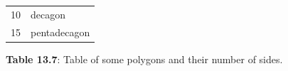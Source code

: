 \begin{table}[H]
{{\begin{center}
\begin{tabular}[t]{|l|l|}
    
        10 &
    
    
        decagon%
     \tabularnewline\cline{1-1}\cline{2-2}
    
    
        15 &
    
    
        pentadecagon%
     \tabularnewline\cline{1-1}\cline{2-2}
    \end{tabular}
      \end{center}
    \begin{center}{\small\bfseries Table 13.7}: Table of some polygons and their number of sides.\end{center}
    
    \addtocounter{footnote}{-0}
    
          }{ %
        
    
        \begin{center}
      
      \label{m38380*uid92}
      
    \noindent
      \tablelasttail{}
      \begin{xtabular}[t]{|l|l|}\hline
    

\end{xtabular}
\end{center}}}
\end{table}
